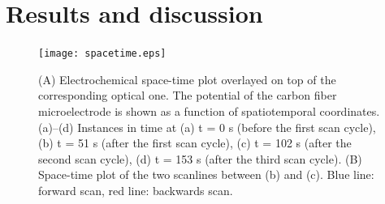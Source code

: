 \documentclass[3p, twocolumn]{elsarticle}
\begin{document}
\section{Results and discussion}




\def\s{0.5}
\begin{figure}

\centering
{}
\texttt{[image: spacetime.eps]}

\caption{(A) Electrochemical space-time plot overlayed on top of the corresponding optical one.
The potential of the carbon fiber microelectrode is shown as a function of spatiotemporal coordinates.
(a)--(d) Instances in time at (a) t = 0 s (before the first scan cycle), (b) t = 51 s (after the first scan cycle), (c) t = 102 s (after the second scan cycle), (d) t = 153 s (after the third scan cycle).
(B) Space-time plot of the two scanlines between (b) and (c).
Blue line: forward scan, red line: backwards scan.}
\label{fig:spatiotemporal}
\end{figure}
\end{document}
